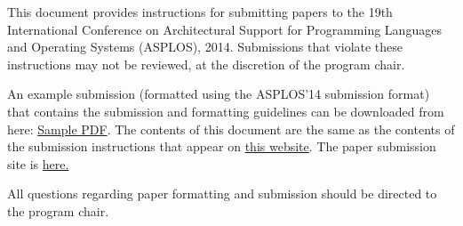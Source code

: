 
This document provides instructions for submitting papers to the 19th
International Conference on Architectural Support for Programming Languages
and Operating Systems (ASPLOS), 2014.  Submissions that violate these
instructions may not be reviewed, at the discretion of the program chair.

An example submission (formatted using the ASPLOS'14 submission format)
that contains the submission and formatting guidelines can be downloaded
from here:
\href{http://www.cs.utah.edu/asplos14/files/asplos14-template.pdf}{Sample
PDF}. The contents of this document are the same as the contents of the
submission instructions that appear on
\href{http://www.cs.utah.edu/asplos14/submission.html}{this website}.  The
paper submission site is \href{http://asplos14.cs.illinois.edu}{here.}

All questions regarding paper formatting and submission should be directed
to the program chair.
